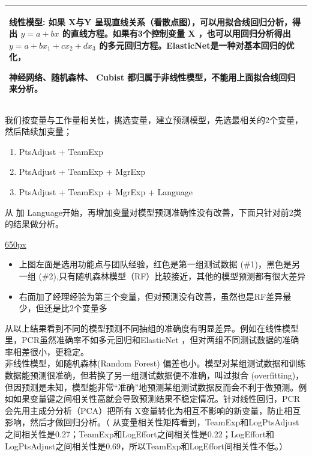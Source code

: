 \begin{longtable}[]{@{}l@{}}
\toprule
\endhead
\begin{minipage}[t]{0.97\columnwidth}\raggedright
线性模型: 如果 X与Y 呈现直线关系（看散点图），可以用拟合线回归分析，得出
\(y = a + b x\) 的直线方程。如果有3个控制变量 X ，也可以用回归分析得出
\(y=a+bx_1 + cx_2+d x_3\)
的多元回归方程。ElasticNet是一种对基本回归的优化，

神经网络、随机森林、 Cubist
都归属于非线性模型，不能用上面拟合线回归来分析。\strut
\end{minipage}\tabularnewline
\bottomrule
\end{longtable}

我们按变量与工作量相关性，挑选变量，建立预测模型，先选最相关的2个变量，然后陆续加变量；

\begin{enumerate}
\tightlist
\item
  PtsAdjust + TeamExp
\item
  PtsAdjust + TeamExp + MgrExp
\item
  PtsAdjust + TeamExp + MgrExp + Language
\end{enumerate}

从 加
Language开始，再增加变量对模型预测准确性没有改善，下面只针对前2类的结果做分析。

\href{文件:CompareRMSE_Screenshot_2025-03-08_142111.jpg}{650px}

\begin{itemize}
\tightlist
\item
  上图左面是选用功能点与团队经验，红色是第一组测试数据
  (\#1)，黑色是另一组
  (\#2),只有随机森林模型（RF）比较接近，其他的模型预测都有很大差异
\item
  右面加了经理经验为第三个变量，但对预测没有改善，虽然也是RF差异最少，但还是比2个变量多
\end{itemize}

从以上结果看到不同的模型预测不同抽组的准确度有明显差异。例如在线性模型里，PCR虽然准确率不如多元回归和ElasticNet
，但对两组不同测试数据的准确率相差很小，更稳定。\\
非线性模型，如随机森林(Random Forest)
偏差也小。模型对某组测试数据和训练数据能预测很准确，但若换了另一组测试数据便不准确，叫过拟合
(overfitting)，但因预测是未知，模型能非常``准确''地预测某组测试数据反而会不利于做预测。例如如果变量键之间相关性高就会导致预测结果不稳定情况。针对线性回归，PCR会先用主成分分析（PCA）把所有
X变量转化为相互不影响的新变量，防止相互影响，然后才做回归分析。（
从变量相关性矩阵看到，TeamExp和LogPtsAdjust之间相关性是0.27；TeamExp和LogEffort之间相关性是0.22；LogEffort和LogPtsAdjust之间相关性是0.69，所以TeamExp和LogEffort间相关性不低。）

